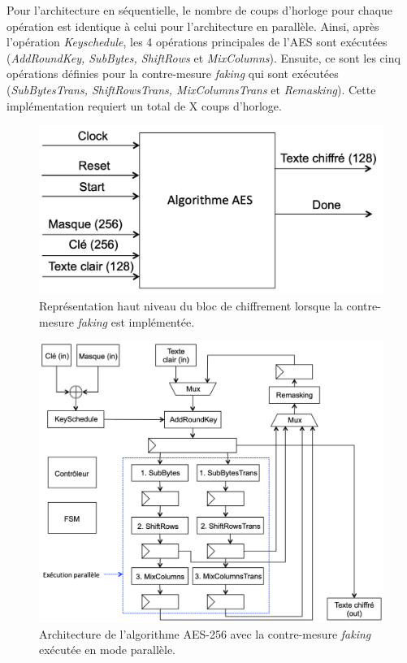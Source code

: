 \documentclass[oneside]{book}
\begin{document}
Pour l'architecture en séquentielle, le nombre de coups d'horloge pour chaque opération est identique à celui pour l'architecture en parallèle. Ainsi, après l'opération \textit{Keyschedule}, les 4 opérations principales de l'AES sont exécutées (\textit{AddRoundKey, SubBytes, ShiftRows} et \textit{MixColumns}). Ensuite, ce sont les cinq opérations définies pour la contre-mesure \textit{faking} qui sont exécutées (\textit{SubBytesTrans, ShiftRowsTrans, MixColumnsTrans} et \textit{Remasking}). Cette implémentation requiert un total de X coups d'horloge.

\begin{figure}[htbp]
    \centering
    \includegraphics[scale=0.5]{image/FPGA_AES_Faking_top}
    \caption{Représentation haut niveau du bloc de chiffrement lorsque la contre-mesure \textit{faking} est implémentée.}
    \label{fig:FPGA_AES_Faking_top} 
\end{figure}

\begin{figure}[htbp]
    \hspace{-0.5cm}
    \includegraphics[scale=0.78]{image/FPGA_arch_faking_parallele}
    \caption{Architecture de l’algorithme AES-256 avec la contre-mesure \textit{faking} exécutée en mode parallèle.}
    \label{fig:FPGA_arch_faking_parallele} 
\end{figure}
\end{document}
